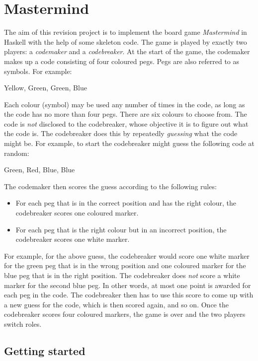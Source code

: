 
\section{Mastermind}

The aim of this revision project is to implement the board game \emph{Mastermind} in Haskell with the help of some skeleton code. The game is played by exactly two players: a \emph{codemaker} and a \emph{codebreaker}. At the start of the game, the codemaker makes up a code consisting of four coloured pegs. Pegs are also referred to as symbols. For example:
\begin{center}
    Yellow, Green, Green, Blue
\end{center}
Each colour (symbol) may be used any number of times in the code, as long as the code has no more than four pegs. There are six colours to choose from. The code is \emph{not} disclosed to the codebreaker, whose objective it is to figure out what the code is. The codebreaker does this by repeatedly \emph{guessing} what the code might be. For example, to start the codebreaker might guess the following code at random:
\begin{center}
    Green, Red, Blue, Blue
\end{center}
The codemaker then scores the guess according to the following rules:
\begin{itemize}
    \item For each peg that is in the correct position and has the right colour, the codebreaker scores one coloured marker.
    \item For each peg that is the right colour but in an incorrect position, the codebreaker scores one white marker.
\end{itemize}
For example, for the above guess, the codebreaker would score one white marker for the green peg that is in the wrong position and one coloured marker for the blue peg that is in the right position. The codebreaker does \emph{not} score a white marker for the second blue peg. In other words, at most one point is awarded for each peg in the code. The codebreaker then has to use this score to come up with a new guess for the code, which is then scored again, and so on. Once the codebreaker scores four coloured markers, the game is over and the two players switch roles.


\subsection{Getting started}

